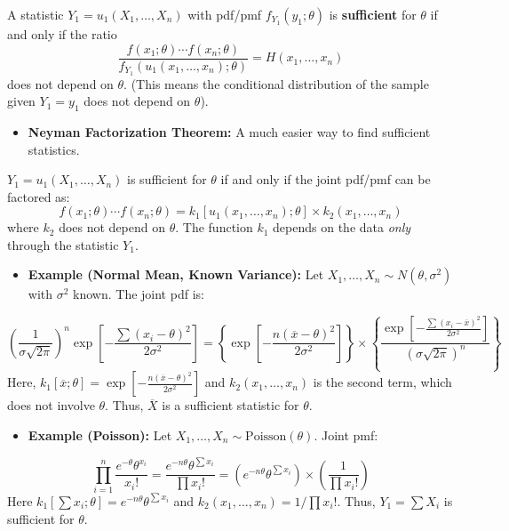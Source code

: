 \begin{definition}
A statistic $Y_1=u_1(X_1, \dots, X_n)$ with pdf/pmf $f_{Y_1}(y_1; \theta)$ is \textbf{sufficient} for $\theta$ if and only if the ratio
\[
\frac{f(x_1; \theta) \cdots f(x_n; \theta)}{f_{Y_1}(u_1(x_1, \dots, x_n); \theta)} = H(x_1, \dots, x_n)
\]does not depend on $\theta$. (This means the conditional distribution of the sample given $Y_1=y_1$ does not depend on $\theta$).
\end{definition}
\begin{itemize}
	\item \textbf{Neyman Factorization Theorem:} A much easier way to find sufficient statistics.
\end{itemize}

\begin{theorem}[Neyman]
$Y_1=u_1(X_1, \dots, X_n)$ is sufficient for $\theta$ if and only if the joint pdf/pmf can be factored as:
\[
f(x_1; \theta) \cdots f(x_n; \theta) = k_1[u_1(x_1, \dots, x_n); \theta] \times k_2(x_1, \dots, x_n)
\]where $k_2$ does not depend on $\theta$. The function $k_1$ depends on the data \textit{only} through the statistic $Y_1$.
\end{theorem}
\begin{itemize}
	\item \textbf{Example (Normal Mean, Known Variance):} Let $X_1, \dots, X_n \sim N(\theta, \sigma^2)$ with $\sigma^2$ known. The joint pdf is:
\end{itemize}
\[
\left(\frac{1}{\sigma \sqrt{2\pi}}\right)^n \exp\left[-\frac{\sum(x_i - \theta)^2}{2\sigma^2}\right] = \left\{\exp\left[-\frac{n(\overline{x}-\theta)^2}{2\sigma^2}\right]\right\} \times \left\{\frac{\exp\left[-\frac{\sum(x_i-\overline{x})^2}{2\sigma^2}\right]}{(\sigma\sqrt{2\pi})^n}\right\}
\]
Here, $k_1[\overline{x}; \theta] = \exp\left[-\frac{n(\overline{x}-\theta)^2}{2\sigma^2}\right]$ and $k_2(x_1, \dots, x_n)$ is the second term, which does not involve $\theta$. Thus, $\overline{X}$ is a sufficient statistic for $\theta$.

\begin{itemize}
	\item \textbf{Example (Poisson):} Let $X_1, \dots, X_n \sim \text{Poisson}(\theta)$. Joint pmf:
\end{itemize}
\[
\prod_{i=1}^n \frac{e^{-\theta} \theta^{x_i}}{x_i!} = \frac{e^{-n\theta} \theta^{\sum x_i}}{\prod x_i!} = \left( e^{-n\theta} \theta^{\sum x_i} \right) \times \left( \frac{1}{\prod x_i!} \right)
\]
Here $k_1[\sum x_i; \theta] = e^{-n\theta} \theta^{\sum x_i}$ and $k_2(x_1, \dots, x_n) = 1 / \prod x_i!$. Thus, $Y_1 = \sum X_i$ is sufficient for $\theta$.

